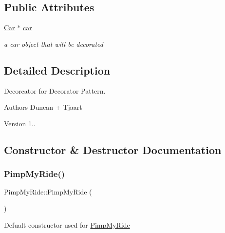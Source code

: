 \subsection*{Public Attributes}
\begin{DoxyCompactItemize}
\item 
\mbox{\label{class_pimp_my_ride_a3800afb8cd2dafa5fa361bc4e852d8d2}} 
\mbox{\hyperlink{class_car}{Car}} $\ast$ \mbox{\hyperlink{class_pimp_my_ride_a3800afb8cd2dafa5fa361bc4e852d8d2}{car}}
\begin{DoxyCompactList}\small\item\em a car object that will be decorated \end{DoxyCompactList}\end{DoxyCompactItemize}


\subsection{Detailed Description}
Decorcator for Decorator Pattern. 

\begin{DoxyAuthor}{Authors}
Duncan + Tjaart 
\end{DoxyAuthor}
\begin{DoxyVersion}{Version}
1.. 
\end{DoxyVersion}


\subsection{Constructor \& Destructor Documentation}
\mbox{\label{class_pimp_my_ride_a8f900ee31c2c6a36492f39c82bdd64fc}} 
\subsubsection{\texorpdfstring{Pimp\+My\+Ride()}{PimpMyRide()}}
{\footnotesize\ttfamily Pimp\+My\+Ride\+::\+Pimp\+My\+Ride (\begin{DoxyParamCaption}{ }\end{DoxyParamCaption})\hspace{0.3cm}{\ttfamily [inline]}}

Defualt constructor used for \mbox{\hyperlink{class_pimp_my_ride}{Pimp\+My\+Ride}} \mbox{\label{class_pimp_my_ride_a891c6679516029bccdac908a09754935}} 
